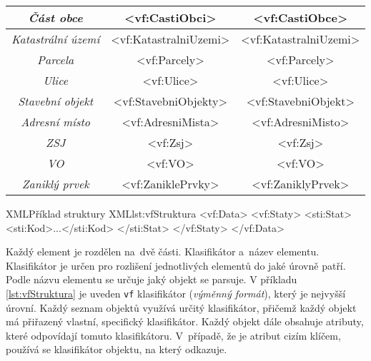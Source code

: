 \begin{table}[!h]
\begin{tabular}{|c|c|c|}
    \textit{Část obce}                   & \textless{}vf:CastiObci\textgreater{}          & \textless{}vf:CastiObce\textgreater{}         \\ \hline
    \textit{Katastrální území}           & \textless{}vf:KatastralniUzemi\textgreater{}   & \textless{}vf:KatastralniUzemi\textgreater{}  \\ \hline
    \textit{Parcela}                     & \textless{}vf:Parcely\textgreater{}            & \textless{}vf:Parcely\textgreater{}           \\ \hline
    \textit{Ulice}                       & \textless{}vf:Ulice\textgreater{}              & \textless{}vf:Ulice\textgreater{}             \\ \hline
    \textit{Stavební objekt}             & \textless{}vf:StavebniObjekty\textgreater{}    & \textless{}vf:StavebniObjekt\textgreater{}    \\ \hline
    \textit{Adresní místo}               & \textless{}vf:AdresniMista\textgreater{}       & \textless{}vf:AdresniMisto\textgreater{}      \\ \hline
    \textit{ZSJ}                         & \textless{}vf:Zsj\textgreater{}                & \textless{}vf:Zsj\textgreater{}               \\ \hline
    \textit{VO}                          & \textless{}vf:VO\textgreater{}                 & \textless{}vf:VO\textgreater{}                \\ \hline
    \textit{Zaniklý prvek}               & \textless{}vf:ZaniklePrvky\textgreater{}       & \textless{}vf:ZaniklyPrvek\textgreater{}      \\ \hline
    \end{tabular}
\end{table}

\newpage

\begin{code}{XML}{Příklad struktury XML}{lst:vfStruktura}
    <vf:Data>
    <vf:Staty>
        <sti:Stat>
            <sti:Kod>...</sti:Kod>
        </sti:Stat>
    </vf:Staty>
</vf:Data>
\end{code}

Každý element je rozdělen na~dvě části.
Klasifikátor a~název elementu.
Klasifikátor je určen pro rozlišení jednotlivých elementů do jaké úrovně patří.
Podle názvu elementu se určuje jaký objekt se parsuje.
V příkladu \ref{lst:vfStruktura} je uveden \texttt{vf} klasifikátor (\textit{výměnný formát}), který je nejvyšší úrovní.
Každý seznam objektů využívá určitý klasifikátor, přičemž každý objekt má přiřazený vlastní, specifický klasifikátor.
Každý objekt dále obsahuje atributy, které odpovídají tomuto klasifikátoru.
V~případě, že je atribut cizím klíčem, používá se klasifikátor objektu, na který odkazuje.

